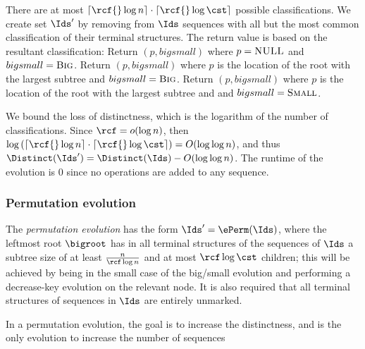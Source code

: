 There are at most $\lceil {\rcf {} \log n} \rceil \cdot \lceil {\rcf {} \log \cst} \rceil$ possible classifications. We create set $\Ids'$ by removing from $\Ids$  sequences with all but the most common classification of their terminal structures. 
The return value is based on the resultant classification:
\shortfull{}{\begin{description}}
 Return $(p,bigsmall)$ where $p=\text{\sc{NULL}}$ and $bigsmall=\text{\sc{Big}}$.
 Return $(p,bigsmall)$ where $p$ is the location of the root with the largest subtree and $bigsmall=\text{\sc{Big}}$.
 Return $(p,bigsmall)$ where $p$ is the location of the root with the largest subtree and and $bigsmall=\text{\sc{Small}}$.
\shortfull{}{\end{description}}

We bound the loss of distinctness, which is the logarithm of the number of classifications.
 Since $\rcf=o(\log n)$, then $\log \left( \lceil {\rcf {} \log n} \rceil \cdot \lceil {\rcf {} \log \cst} \rceil\right)= O(\log \log n)$, and thus $\Distinct(\Ids') = \Distinct(\Ids)- O(\log \log n)$. The runtime of the evolution is 0 since no operations are added to any sequence.



\subsubsection{Permutation evolution} 



The \emph{permutation evolution} has the form $\Ids'=\ePerm (\Ids )$, where the leftmost root $\bigroot$ has in all terminal structures of the sequences of $\Ids$  a subtree size of at least $\frac{n  }{\rcf \log n}$ and at most ${\rcf  \log \cst}$ children; this will be achieved by being in the  small case of the big/small evolution and performing a decrease-key evolution on the relevant node.
It is also required that all terminal structures of sequences in $\Ids$ are entirely unmarked.
\begin{fullonly}

\end{fullonly}
In a permutation evolution, the goal is to increase the distinctness, and is the only evolution to increase the number of sequences 

